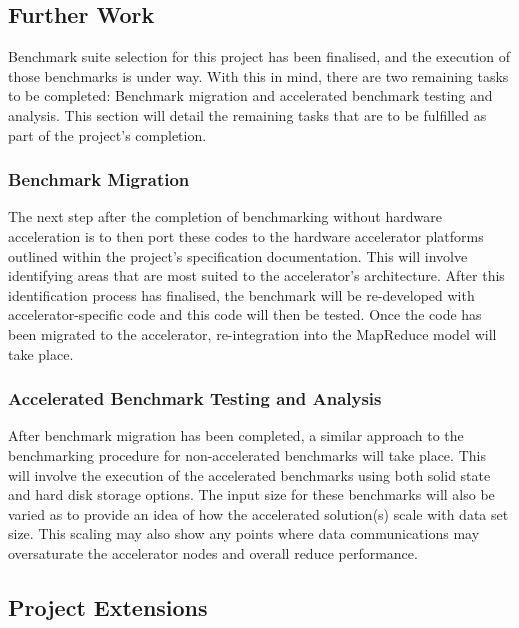 \documentclass[12pt,a4paper]{article}
\begin{document}
        \subsection{Further Work}
        \label{sub:further_work}

            Benchmark suite selection for this project has been finalised, and the execution of those benchmarks is under way. With this in mind, there are two remaining tasks to be completed: Benchmark migration and accelerated benchmark testing and analysis. This section will detail the remaining tasks that are to be fulfilled as part of the project's completion.

                \subsubsection{Benchmark Migration}
                \label{sub:benchmark_migration}

                    The next step after the completion of benchmarking without hardware acceleration is to then port these codes to the hardware accelerator platforms outlined within the project's specification documentation. This will involve identifying areas that are most suited to the accelerator's architecture. After this identification process has finalised, the benchmark will be re-developed with accelerator-specific code and this code will then be tested. Once the code has been migrated to the accelerator, re-integration into the MapReduce model will take place.

                \subsubsection{Accelerated Benchmark Testing and Analysis}
                \label{sub:accelerated_benchmark_testing_and_analysis}

                    After benchmark migration has been completed, a similar approach to the benchmarking procedure for non-accelerated benchmarks will take place. This will involve the execution of the accelerated benchmarks using both solid state and hard disk storage options. The input size for these benchmarks will also be varied as to provide an idea of how the accelerated solution(s) scale with data set size. This scaling may also show any points where data communications may oversaturate the accelerator nodes and overall reduce performance.
        
        \subsection{Project Extensions}
        \label{sub:project_extensions}
\end{document}
